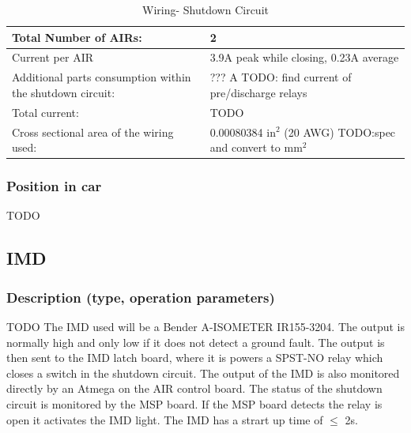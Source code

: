 \documentclass{article}
\begin{document}
	\begin{table}[H]
        \centering
        \begin{tabular}{|l|l|}
        \hline
            Total Number of AIRs: & 2 \\ \hline
            Current per AIR & 3.9A peak while closing, 0.23A average\\ \hline
            Additional parts consumption within the shutdown circuit: & ??? A TODO: find current of pre/discharge relays \\ \hline
            Total current: & TODO \\ \hline
            Cross sectional area of the wiring used: & 0.00080384 in$^2$ (20 AWG) TODO:spec and convert to mm$^2$ \\ \hline
        \end{tabular}
        \caption{Wiring- Shutdown Circuit}
        \label{ShutdownCircuitTable}
    \end{table}

\subsubsection{Position in car}
TODO









\subsection{IMD}
\subsubsection{Description (type, operation parameters)}TODO
The IMD used will be a Bender A-ISOMETER IR155-3204. The output is normally high and only low if it does not detect a ground fault. The output is then sent to the IMD latch board, where it is powers a SPST-NO relay which closes a switch in the shutdown circuit. The output of the IMD is also monitored directly by an Atmega on the AIR control board. The status of the shutdown circuit is monitored by the MSP board. If the MSP board detects the relay is  open it activates the IMD light. The IMD has a strart up time of $\leq$ 2s.


\end{document}
